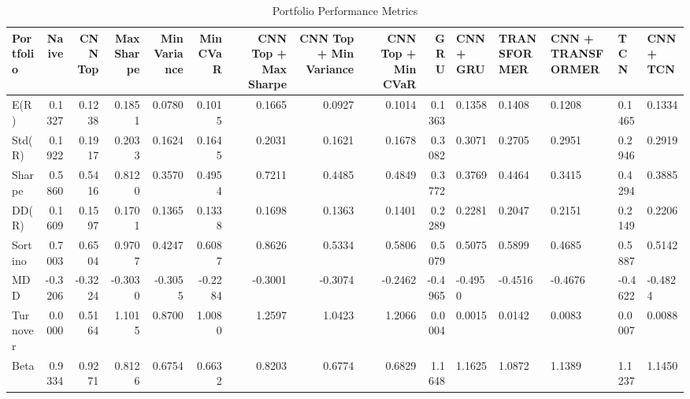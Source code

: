 \begin{table}[htbp]
\centering
\caption{Portfolio Performance Metrics}
\begin{tabular}{lrrrrrrrrr}
\hline
Portfolio & Naive & CNN Top & Max Sharpe & Min Variance & Min CVaR & CNN Top + Max Sharpe & CNN Top + Min Variance & CNN Top + Min CVaR & GRU & CNN + GRU & TRANSFORMER & CNN + TRANSFORMER & TCN & CNN + TCN \\
\hline
E(R) & 0.1327 & 0.1238 & 0.1851 & 0.0780 & 0.1015 & 0.1665 & 0.0927 & 0.1014 & 0.1363 & 0.1358 & 0.1408 & 0.1208 & 0.1465 & 0.1334 \\
Std(R) & 0.1922 & 0.1917 & 0.2033 & 0.1624 & 0.1645 & 0.2031 & 0.1621 & 0.1678 & 0.3082 & 0.3071 & 0.2705 & 0.2951 & 0.2946 & 0.2919 \\
Sharpe & 0.5860 & 0.5416 & 0.8120 & 0.3570 & 0.4954 & 0.7211 & 0.4485 & 0.4849 & 0.3772 & 0.3769 & 0.4464 & 0.3415 & 0.4294 & 0.3885 \\
DD(R) & 0.1609 & 0.1597 & 0.1701 & 0.1365 & 0.1338 & 0.1698 & 0.1363 & 0.1401 & 0.2289 & 0.2281 & 0.2047 & 0.2151 & 0.2149 & 0.2206 \\
Sortino & 0.7003 & 0.6504 & 0.9707 & 0.4247 & 0.6087 & 0.8626 & 0.5334 & 0.5806 & 0.5079 & 0.5075 & 0.5899 & 0.4685 & 0.5887 & 0.5142 \\
MDD & -0.3206 & -0.3224 & -0.3030 & -0.3055 & -0.2284 & -0.3001 & -0.3074 & -0.2462 & -0.4965 & -0.4950 & -0.4516 & -0.4676 & -0.4622 & -0.4824 \\
Turnover & 0.0000 & 0.5164 & 1.1015 & 0.8700 & 1.0080 & 1.2597 & 1.0423 & 1.2066 & 0.0004 & 0.0015 & 0.0142 & 0.0083 & 0.0007 & 0.0088 \\
Beta & 0.9334 & 0.9271 & 0.8126 & 0.6754 & 0.6632 & 0.8203 & 0.6774 & 0.6829 & 1.1648 & 1.1625 & 1.0872 & 1.1389 & 1.1237 & 1.1450 \\
\hline
\end{tabular}
\end{table}
